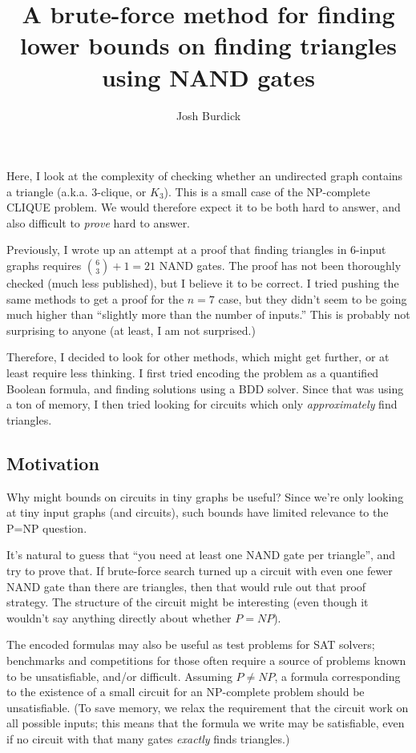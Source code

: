 \documentclass[12pt]{article}
\begin{document}
\title{A brute-force method for finding lower bounds on finding triangles using NAND gates}
\author{Josh Burdick}
\maketitle

Here, I look at the complexity of checking whether an undirected
graph contains a triangle (a.k.a. 3-clique, or $K_3$).
This is a small case of the NP-complete
CLIQUE problem. We would therefore expect it to be both hard to answer, and also difficult
to {\em prove} hard to answer.

Previously, I wrote up an attempt at a proof that
finding triangles in 6-input graphs requires
${6 \choose 3} + 1 = 21$ NAND gates.
The proof has not been thoroughly checked (much less
published), but I believe it to be correct.
I tried pushing the same methods to get a proof for the
$n=7$ case, but they didn't seem to be going much higher
than ``slightly more than the number of inputs.'' 
This is probably not surprising to anyone (at least,
I am not surprised.)

Therefore, I decided to look for other methods, which
might get further, or at least require less thinking.
I first tried encoding the problem
as a quantified Boolean formula, and finding solutions
using a BDD solver. Since that was using a ton of memory,
I then tried looking for circuits which only {\em approximately}
find triangles.

\subsection{Motivation}

Why might bounds on circuits in tiny graphs be useful? Since we're
only looking at tiny input graphs (and circuits), such bounds have
limited relevance to the P=NP question.

It's natural to guess that ``you need at least one NAND gate per triangle'',
and try to prove that.
If brute-force search turned up a circuit with even one fewer NAND gate
than there are triangles,
then that would rule out that proof strategy.
The structure of the circuit might be interesting (even though it wouldn't
say anything directly about whether $P=NP$).

The encoded formulas may also be useful as test problems for SAT solvers;
benchmarks and competitions for those often require a source of
problems known to be unsatisfiable, and/or difficult. Assuming $P \ne NP$,
a formula corresponding to the existence of a small circuit for an NP-complete
problem should be unsatisfiable. (To save memory, we relax the requirement
that the circuit work on all possible inputs; this means that the formula we
write may be satisfiable, even if no circuit with that many gates {\em exactly}
finds triangles.)
\end{document}
